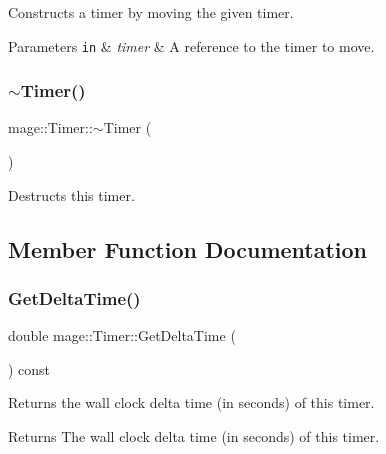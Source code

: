 Constructs a timer by moving the given timer.


\begin{DoxyParams}[1]{Parameters}
\mbox{\tt in}  & {\em timer} & A reference to the timer to move. \\
\hline
\end{DoxyParams}
\hypertarget{classmage_1_1_timer_a66d6964a6d42eef72f7312f1233e4f74}{}\label{classmage_1_1_timer_a66d6964a6d42eef72f7312f1233e4f74} 
\subsubsection{\texorpdfstring{$\sim$\+Timer()}{~Timer()}}
{\footnotesize\ttfamily mage\+::\+Timer\+::$\sim$\+Timer (\begin{DoxyParamCaption}{ }\end{DoxyParamCaption})\hspace{0.3cm}{\ttfamily [default]}}

Destructs this timer. 

\subsection{Member Function Documentation}
\hypertarget{classmage_1_1_timer_a83508bc11ab27be8186532352ddd0376}{}\label{classmage_1_1_timer_a83508bc11ab27be8186532352ddd0376} 
\subsubsection{\texorpdfstring{Get\+Delta\+Time()}{GetDeltaTime()}}
{\footnotesize\ttfamily double mage\+::\+Timer\+::\+Get\+Delta\+Time (\begin{DoxyParamCaption}{ }\end{DoxyParamCaption}) const}

Returns the wall clock delta time (in seconds) of this timer.

\begin{DoxyReturn}{Returns}
The wall clock delta time (in seconds) of this timer. 
\end{DoxyReturn}
\hypertarget{classmage_1_1_timer_a4e304e66d8466e2f6fa04d3d95c92d10}{}\label{classmage_1_1_timer_a4e304e66d8466e2f6fa04d3d95c92d10} 
